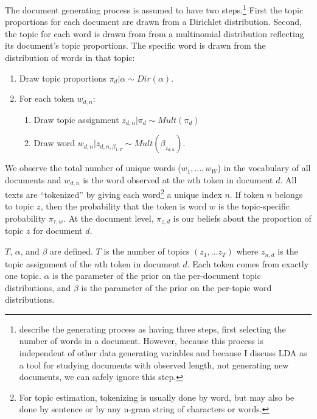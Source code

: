 \documentclass{article}
\begin{document}
The document generating process is assumed to have two steps.\footnote{\citet{Blei2003} describe the generating process as having three steps, first selecting the number of words in a document. However, because this process is independent of other data generating variables and because I discuss LDA as a tool for studying documents with observed length, not generating new documents, we can safely ignore this step.} First the topic proportions for each document are drawn from a Dirichlet distribution. Second, the topic for each word is drawn from from a multinomial distribution reflecting its document's topic proportions. The specific word is drawn from the distribution of words in that topic:
\begin{enumerate}
\item Draw topic proportions $\pi_d | \alpha \sim Dir(\alpha).$
\item For each token $w_{d,n}$:\begin{enumerate}
\item Draw topic assignment $z_{d, n} | \pi_d \sim Mult(\pi_d)$
\item Draw word $w_{d,n} | z_{d,n,\beta_{1:T}} \sim Mult(\beta_{z_{d,n}}).$\end{enumerate}
\end{enumerate}


We observe the total number of unique words ($w_1,...,w_W$) in the vocabulary of all documents and $w_{d,n}$ is the word observed at the $n$th token in document $d$. All texts are ``tokenized'' by giving each word\footnote{For topic estimation, tokenizing is usually done by word, but may also be done by sentence or by any n-gram string of characters or words.} a unique index $n$. If token $n$ belongs to topic $z$, then the probability that the token is word $w$ is the topic-specific probability $\pi_{\tau, w}$. At the document level, $\pi_{z, d}$ %
is our beliefs about the proportion of topic $z$ for document $d$. %

$T$, $\alpha$, and $\beta$ are defined. 
$T$ is the number of topics $(z_1,...z_T)$ where $z_{n, d}$ is the topic assignment of the $n$th token in document $d$. Each token comes from exactly one topic.
$\alpha$ is the parameter of the prior on the per-document topic distributions, and
$\beta$ is the parameter of the prior on the per-topic word distributions. 
\end{document}
